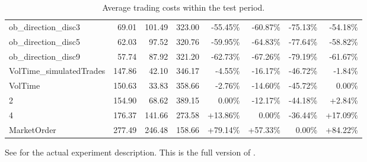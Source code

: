 \begin{table}[ht]
{\begin{tabular}{lRRR|RRRR}
\midrule
ob\_direction\_disc3             &     69.01 &  101.49 &  323.00 &  -55.45\% &  -60.87\% &  -75.13\% &      -54.18\% \\
ob\_direction\_disc5             &     62.03 &   97.52 &  320.76 &  -59.95\% &  -64.83\% &  -77.64\% &      -58.82\% \\
ob\_direction\_disc9             &     57.74 &   87.92 &  321.20 &  -62.73\% &  -67.26\% &  -79.19\% &      -61.67\% \\
\midrule
VolTime\_simulatedTrades &    147.86 &   42.10 &  346.17 &   -4.55\% &  -16.17\% &  -46.72\% &       -1.84\% \\
VolTime                        &    150.63 &   33.83 &  358.66 &   -2.76\% &  -14.60\% &  -45.72\% &        0.00\% \\
2                              &    154.90 &   68.62 &  389.15 &    0.00\% &  -12.17\% &  -44.18\% &        +2.84\% \\
4                              &    176.37 &  141.66 &  273.58 &   +13.86\% &    0.00\% &  -36.44\% &       +17.09\% \\
MarketOrder                    &    277.49 &  246.48 &  158.66 &   +79.14\% &   +57.33\% &    0.00\% &      +84.22\% \\
\bottomrule
\end{tabular}}

        		\caption[Full version of ]{Average trading costs within the test period.}
		See  for the actual experiment description. This is the full version of .
		\label{tab:eval:additionalMarketVariables:simulatedTrades:fulltable}
\end{table}